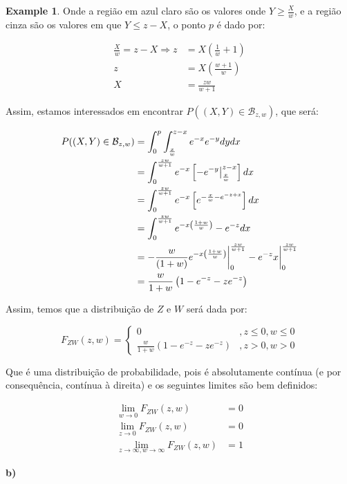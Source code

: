 \documentclass[
]{article}
\theoremstyle{definition}
\theoremstyle{definition}
\newtheorem{example}{Example}[section]
\theoremstyle{definition}
\theoremstyle{definition}
\theoremstyle{remark}
\begin{document}
\begin{example}
Onde a região em azul claro são os valores onde \(Y \ge \frac{X}{w}\), e a região cinza são os valores em que \(Y \le z - X\), o ponto \(p\) é dado por:

\begin{align*}
\frac{X}{w} = z - X \Rightarrow z &= X \left(\frac{1}{w} +1\right) \\
z &= X\left(\frac{w+1}{w}\right) \\
X &= \frac{zw}{w+1}
\end{align*}

Assim, estamos interessados em encontrar \(P((X,Y) \in \mathcal{B}_{z,w})\), que será:

\begin{align*}
P((X,Y) \in \mathcal{B}_{z,w}) &= \int_{0}^{p}\int_{\frac{x}{w}}^{z-x}e^{-x}e^{-y}dydx \\
&= \int_{0}^{\frac{zw}{w+1}}e^{-x}\left[-e^{-y}\big{|}_{\frac{x}{w}}^{z-x}\right]dx \\
&= \int_{0}^{\frac{zw}{w+1}}e^{-x}\left[e^{-\frac{x}{w}-e^{-z+x}}\right]dx \\
&= \int_{0}^{\frac{zw}{w+1}}e^{-x\left(\frac{1 + w}{w}\right)}-e^{-z}dx \\
&= -\frac{w}{(1+w)}e^{-x\left(\frac{1 + w}{w}\right)}\bigg{|}_{0}^{\frac{zw}{w+1}}-e^{-z}x\bigg{|}_{0}^{\frac{zw}{w+1}} \\
&= \frac{w}{1+w}\left(1-e^{-z}-ze^{-z}\right)
\end{align*}

Assim, temos que a distribuição de \(Z\) e \(W\) será dada por:

\begin{equation*}
F_{ZW}(z,w) = \begin{cases}
0 & ,z \le 0, w \le 0 \\
\frac{w}{1+w}\left(1-e^{-z}-ze^{-z}\right) & ,z > 0, w > 0
\end{cases}
\end{equation*}

Que é uma distribuição de probabilidade, pois é absolutamente contínua (e por consequência, contínua à direita) e os seguintes limites são bem definidos:

\begin{align*}
\lim_{w \to 0}F_{ZW}(z,w) &= 0 \\
\lim_{z \to 0}F_{ZW}(z,w) &= 0 \\
\lim_{z \to \infty, w \to \infty}F_{ZW}(z,w) &= 1
\end{align*}

\textbf{b)}


\end{example}
\end{document}
